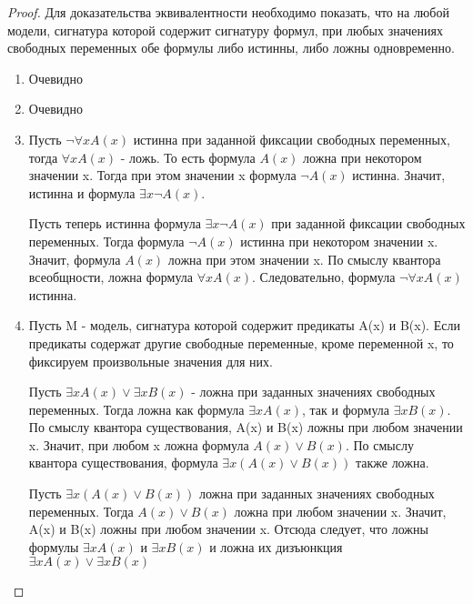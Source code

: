 \documentclass[a4paper]{article}
\theoremstyle{definition}
\theoremstyle{remark}
\begin{document}
    \begin{proof}
        Для доказательства эквивалентности необходимо показать, 
        что на любой модели, сигнатура которой содержит сигнатуру формул,
        при любых значениях свободных переменных обе формулы либо истинны, 
        либо ложны одновременно.
        \begin{enumerate}
            \item Очевидно
            \item Очевидно
            \item 
            Пусть $\neg \forall xA(x)$ истинна при заданной фиксации свободных переменных,
            тогда $\forall xA(x)$ - ложь. То есть формула $A(x)$ ложна при некотором значении
            x. Тогда при этом значении x формула $\neg A(x)$ истинна. Значит, истинна и
            формула $\exists x\neg A(x)$.

            Пусть теперь истинна формула $\exists x\neg A(x)$ при заданной фиксации свободных
             переменных. Тогда формула $\neg A(x) $ истинна при некотором значении
            x. Значит, формула $ A(x)$ ложна при этом значении x. По смыслу квантора всеобщности, ложна формула $\forall xA(x)$. Следовательно, формула $\neg \forall xA(x)$
            истинна.
            \item 
            Пусть M - модель, сигнатура которой содержит предикаты A(x) и
            B(x). Если предикаты содержат другие свободные переменные, кроме переменной x, то фиксируем произвольные значения для них.
            
            Пусть $\exists xA(x) \vee  \exists xB(x)$ - ложна при заданных значениях свободных
            переменных. Тогда ложна как формула $\exists xA(x)$, так и формула $\exists xB(x)$. По
            смыслу квантора существования, A(x) и B(x) ложны при любом значении
            x. Значит, при любом x ложна формула $A(x) \vee  B(x)$. По смыслу квантора
            существования, формула $\exists x(A(x) \vee  B(x))$ также ложна.

            Пусть $\exists x(A(x) \vee  B(x))$ ложна при заданных значениях свободных переменных. 
            Тогда $A(x) \vee  B(x)$ ложна при любом значении x. Значит, A(x) и
            B(x) ложны при любом значении x. Отсюда следует, что ложны формулы
            $\exists xA(x)$ и $\exists xB(x)$ и ложна их дизъюнкция $\exists xA(x) \vee  \exists xB(x)$
        \end{enumerate}
    \end{proof}
\end{document}
